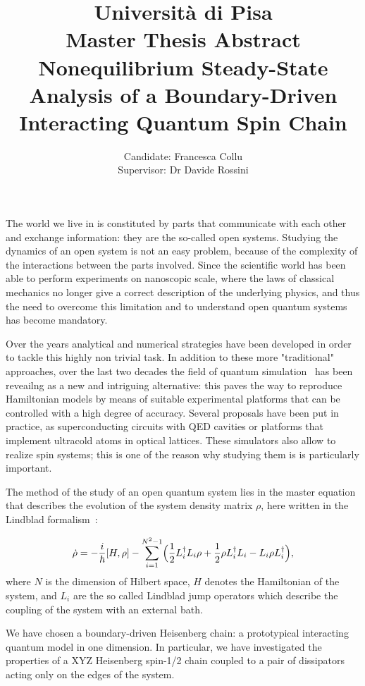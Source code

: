 \documentclass[12pt]{extarticle}
\title{{\normalsize{Università di Pisa}}\\{\normalsize{Master Thesis Abstract}}\\[1cm]\textbf{Nonequilibrium Steady-State Analysis of a Boundary-Driven Interacting Quantum Spin Chain}}
\author{Candidate: Francesca Collu\\{Supervisor: Dr Davide Rossini}}
\date{}
\begin{document}
\maketitle

The world we live in is constituted by parts that communicate with each other and exchange information: they are the so-called open systems. Studying the dynamics of an open system is not an easy problem, because of the complexity of the interactions between the parts involved. Since the scientific world has been able to perform experiments on nanoscopic scale, where the laws of classical mechanics no longer give a correct description of the underlying physics, and thus the need to overcome this limitation and to understand open quantum systems has become mandatory.

Over the years analytical and numerical strategies have been developed in order to tackle this highly non trivial task. In addition to these more "traditional" approaches, over the last two decades the field of quantum simulation~\cite{special_issue_nature} has been reveailng as a new and intriguing alternative: this paves the way to reproduce Hamiltonian models by means of suitable experimental platforms that can be controlled with a high degree of accuracy. Several proposals have been put in practice, as superconducting circuits with QED cavities or platforms that implement ultracold atoms in optical lattices. These simulators also allow to realize spin systems; this is one of the reason why studying them is is particularly important.

The method of the study of an open quantum system lies in the master equation that describes the evolution of the system density matrix $\rho$, here written in the Lindblad formalism~\cite{pet_breuer:open_quantum}:

\begin{equation*}
    \dot{\rho} = -\frac{i}{\hbar}[H, \rho] - \sum_{i=1}^{N^2-1} \Bigl(\frac{1}{2}L_i^{\dagger}L_i\rho + \frac{1}{2}\rho L_i^{\dagger}L_i - L_i\rho L_i^{\dagger}\Bigl),
\end{equation*}
where $N$ is the dimension of Hilbert space, $H$ denotes the Hamiltonian of the system, and $L_i$ are the so called Lindblad jump operators which describe the coupling of the system with an external bath.

We have chosen a boundary-driven Heisenberg chain: a prototypical interacting quantum model in one dimension. In particular, we have investigated the properties of a XYZ Heisenberg spin-1/2 chain coupled to a pair of dissipators acting only on the edges of the system. 
\end{document}
